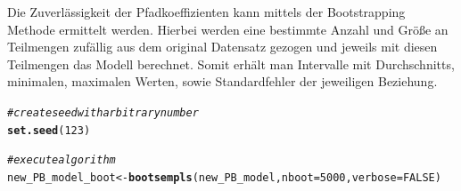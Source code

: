 \documentclass{article}\usepackage[]{graphicx}\usepackage[]{color}
\makeatletter
\newcommand{\hlnum}[1]{\textcolor[rgb]{0.686,0.059,0.569}{#1}}%
\newcommand{\hlcom}[1]{\textcolor[rgb]{0.678,0.584,0.686}{\textit{#1}}}%
\newcommand{\hlstd}[1]{\textcolor[rgb]{0.345,0.345,0.345}{#1}}%
\newcommand{\hlkwb}[1]{\textcolor[rgb]{0.69,0.353,0.396}{#1}}%
\newcommand{\hlkwc}[1]{\textcolor[rgb]{0.333,0.667,0.333}{#1}}%
\newcommand{\hlkwd}[1]{\textcolor[rgb]{0.737,0.353,0.396}{\textbf{#1}}}%
\newenvironment{kframe}{%
 \def\at@end@of@kframe{}%
 \ifinner\ifhmode%
  \def\at@end@of@kframe{\end{minipage}}%
  \begin{minipage}{\columnwidth}%
 \fi\fi%
 \def\FrameCommand##1{\hskip\@totalleftmargin \hskip-\fboxsep
 \colorbox{shadecolor}{##1}\hskip-\fboxsep
     \hskip-\linewidth \hskip-\@totalleftmargin \hskip\columnwidth}%
 \MakeFramed {\advance\hsize-\width
   \@totalleftmargin\z@ \linewidth\hsize
   \@setminipage}}%
 {\par\unskip\endMakeFramed%
 \at@end@of@kframe}
\newenvironment{knitrout}{}{} %
\makeatother
\begin{document}
Die Zuverlässigkeit der Pfadkoeffizienten kann mittels der Bootstrapping Methode ermittelt werden. Hierbei werden eine bestimmte Anzahl und Größe an Teilmengen zufällig aus dem original Datensatz gezogen und jeweils mit diesen Teilmengen das Modell berechnet. Somit erhält man Intervalle mit Durchschnitts, minimalen, maximalen Werten, sowie Standardfehler der jeweiligen Beziehung.

\begin{knitrout}
\color{fgcolor}\begin{kframe}
\begin{alltt}
\hlcom{#create seed with arbitrary number}
\hlkwd{set.seed}\hlstd{(}\hlnum{123}\hlstd{)}

\hlcom{#execute algorithm}
\hlstd{new_PB_model_boot} \hlkwb{<-} \hlkwd{bootsempls}\hlstd{(new_PB_model,} \hlkwc{nboot}\hlstd{=}\hlnum{5000}\hlstd{,} \hlkwc{verbose}\hlstd{=}\hlnum{FALSE}\hlstd{)}


\end{alltt}
\end{kframe}
\end{knitrout}
\end{document}
